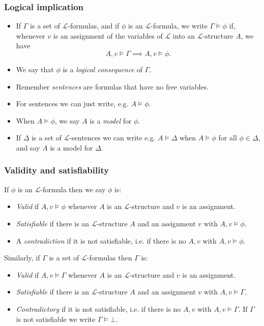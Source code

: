 \documentclass[handout]{beamer}
\newcommand{\sL}{\mathscr{L}}
\begin{document}
\begin{frame}
\frametitle{Logical implication}
\begin{itemize}
\item If $\Gamma$ is a set of $\sL$-formulas, and if $\phi$ is an $\sL$-formula, we write $\Gamma\models \phi$ if, whenever $v$ is an assignment of the variables of $\sL$ into an $\sL$-structure $A$, we have \[A, v \models \Gamma\implies A,v \models \phi.\]
\item We say that $\phi$ is a \emph{logical consequence} of $\Gamma$.
\vspace{0.2cm}
\item Remember \emph{sentences} are formulas that have no free variables.
\vspace{0.2cm}
\item For sentences we can just write, e.g. $A\models \phi.$
\vspace{0.2cm}
\item When $A\models \phi$, we say $A$ is a \emph{model} for $\phi$. 
\vspace{0.2cm}
\item If $\Delta$ is a set of $\sL$-sentences we can write e.g. $A\models \Delta$ when $A\models \phi$ for all $\phi\in\Delta$, and say $A$ is a model for $\Delta$.
\end{itemize}
\end{frame}

\begin{frame}
\frametitle{Validity and satisfiability}
\begin{definition}
If $\phi$ is an $\sL$-formula then we say $\phi$ is:
\begin{itemize}
\item \emph{Valid} if $A,v\models \phi$ whenever $A$ is an $\sL$-structure and $v$ is an assignment.
\item \emph{Satisfiable} if there is an $\sL$-structure $A$ and an assignment $v$ with $A,v\models \phi$.
\item A \emph{contradiction} if it is not satisfiable, i.e. if there is no $A,v$ with $A,v\models\phi$.
\end{itemize}

Similarly, if $\Gamma$ is a set of $\sL$-formulas then $\Gamma$ is:
\begin{itemize}
\item \emph{Valid} if $A,v\models \Gamma$ whenever $A$ is an $\sL$-structure and $v$ is an assignment.
\item \emph{Satisfiable} if there is an $\sL$-structure $A$ and an assignment $v$ with $A,v\models \Gamma$.
\item \emph{Contradictory} if it is not satisfiable, i.e. if there is no $A,v$ with $A,v\models\Gamma$. If $\Gamma$ is not satisfiable we write $\Gamma\models \bot$.
\end{itemize}
\end{definition}
\end{frame}
\end{document}
